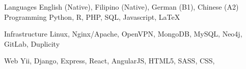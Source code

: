 

\begin{cvskills}

      \cvskill
        {Languages} %
        {English (Native), Filipino (Native), German (B1), Chinese (A2)} %
  \cvskill
    {Programming} %
    {Python, R, PHP, SQL, Javascript, LaTeX} %

  \cvskill
  {Infrastructure}
  {Linux, Nginx/Apache, OpenVPN, MongoDB, MySQL, Neo4j, GitLab, Duplicity}

  \cvskill
    {Web} %
    {Yii, Django, Express, React, AngularJS, HTML5, SASS, CSS, } %

\end{cvskills}

